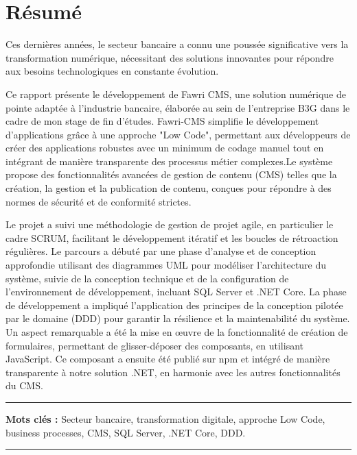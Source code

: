 \chapter*{Résumé}

\hspace{\parindent} Ces dernières années, le secteur bancaire a connu une poussée significative vers la transformation numérique, nécessitant des solutions innovantes pour répondre aux besoins technologiques en constante évolution.

Ce rapport présente le développement de Fawri CMS, une solution numérique de pointe adaptée à l'industrie bancaire, élaborée au sein de l'entreprise B3G dans le cadre de mon stage de fin d'études. Fawri-CMS simplifie le développement d'applications grâce à une approche "Low Code", permettant aux développeurs de créer des applications robustes avec un minimum de codage manuel tout en intégrant de manière transparente des processus métier complexes.Le système propose des fonctionnalités avancées de gestion de contenu (CMS) telles que la création, la gestion et la publication de contenu, conçues pour répondre à des normes de sécurité et de conformité strictes.

Le projet a suivi une méthodologie de gestion de projet agile, en particulier le cadre SCRUM, facilitant le développement itératif et les boucles de rétroaction régulières. Le parcours a débuté par une phase d’analyse et de conception approfondie utilisant des diagrammes UML pour modéliser l’architecture du système, suivie de la conception technique et de la configuration de l’environnement de développement, incluant SQL Server et .NET Core.
La phase de développement a impliqué l'application des principes de la conception pilotée par le domaine (DDD) pour garantir la résilience et la maintenabilité du système. Un aspect remarquable a été la mise en œuvre de la fonctionnalité de création de formulaires, permettant de glisser-déposer des composants, en utilisant JavaScript. Ce composant a ensuite été publié sur npm et intégré de manière transparente à notre solution .NET, en harmonie avec les autres fonctionnalités du CMS.

\noindent\rule[2pt]{\textwidth}{0.5pt}

{\textbf{Mots clés :}}
Secteur bancaire, transformation digitale, approche Low Code, business processes, CMS, SQL Server, .NET Core, DDD.
\\
\noindent\rule[2pt]{\textwidth}{0.5pt}